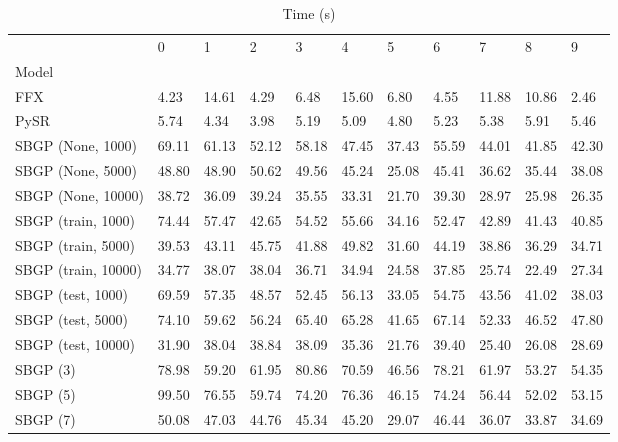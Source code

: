 \begin{table}
\caption{Time (s)}
\label{tab:Time}
\begin{tabular}{lllllllllll}
\toprule
 & 0 & 1 & 2 & 3 & 4 & 5 & 6 & 7 & 8 & 9 \\
Model &  &  &  &  &  &  &  &  &  &  \\
\midrule
FFX & 4.23 & 14.61 & 4.29 & 6.48 & 15.60 & 6.80 & 4.55 & 11.88 & 10.86 & 2.46 \\
PySR & 5.74 & 4.34 & 3.98 & 5.19 & 5.09 & 4.80 & 5.23 & 5.38 & 5.91 & 5.46 \\
SBGP (None, 1000) & 69.11 & 61.13 & 52.12 & 58.18 & 47.45 & 37.43 & 55.59 & 44.01 & 41.85 & 42.30 \\
SBGP (None, 5000) & 48.80 & 48.90 & 50.62 & 49.56 & 45.24 & 25.08 & 45.41 & 36.62 & 35.44 & 38.08 \\
SBGP (None, 10000) & 38.72 & 36.09 & 39.24 & 35.55 & 33.31 & 21.70 & 39.30 & 28.97 & 25.98 & 26.35 \\
SBGP (train, 1000) & 74.44 & 57.47 & 42.65 & 54.52 & 55.66 & 34.16 & 52.47 & 42.89 & 41.43 & 40.85 \\
SBGP (train, 5000) & 39.53 & 43.11 & 45.75 & 41.88 & 49.82 & 31.60 & 44.19 & 38.86 & 36.29 & 34.71 \\
SBGP (train, 10000) & 34.77 & 38.07 & 38.04 & 36.71 & 34.94 & 24.58 & 37.85 & 25.74 & 22.49 & 27.34 \\
SBGP (test, 1000) & 69.59 & 57.35 & 48.57 & 52.45 & 56.13 & 33.05 & 54.75 & 43.56 & 41.02 & 38.03 \\
SBGP (test, 5000) & 74.10 & 59.62 & 56.24 & 65.40 & 65.28 & 41.65 & 67.14 & 52.33 & 46.52 & 47.80 \\
SBGP (test, 10000) & 31.90 & 38.04 & 38.84 & 38.09 & 35.36 & 21.76 & 39.40 & 25.40 & 26.08 & 28.69 \\
SBGP (3) & 78.98 & 59.20 & 61.95 & 80.86 & 70.59 & 46.56 & 78.21 & 61.97 & 53.27 & 54.35 \\
SBGP (5) & 99.50 & 76.55 & 59.74 & 74.20 & 76.36 & 46.15 & 74.24 & 56.44 & 52.02 & 53.15 \\
SBGP (7) & 50.08 & 47.03 & 44.76 & 45.34 & 45.20 & 29.07 & 46.44 & 36.07 & 33.87 & 34.69 \\
\bottomrule
\end{tabular}
\end{table}
